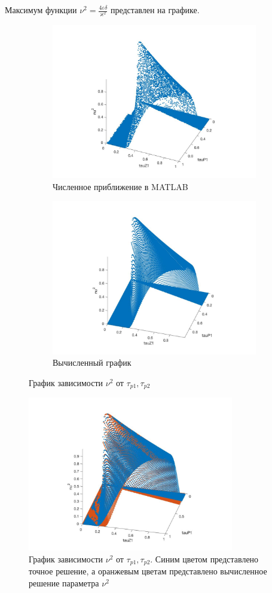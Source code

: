 \documentclass[a4paper,14pt]{extarticle} %
\begin{document}
  Максимум функции $\nu^2 = \frac{4\varepsilon\delta}{\varkappa^2}$ представлен на графике.
  \begin{figure}[H]
\begin{subfigure}{.5\textwidth}
  \includegraphics[width=9cm]{images/filter2_tau0_1e.jpg}
  \caption{Численное приближение в MATLAB}
  \label{filter2:sub1}
\end{subfigure}%
 \begin{subfigure}{.5\textwidth}
  \includegraphics[width=9cm]{images/filter2_tau0_1.jpg}
  \caption{Вычисленный график}
  \label{filter2:sub2}
\end{subfigure}%
\caption{График зависимости $\nu^2$ от $\tau_{p1}, \tau_{p2}$}
\label{filter2:filter2_fig}
\end{figure}

  \begin{figure}[H]
\includegraphics[width=9cm]{images/main.jpg}
\caption{График зависимости $\nu^2$ от $\tau_{p1}, \tau_{p2}$.  Синим цветом представлено точное решение, а оранжевым цветам представлено вычисленное решение параметра $\nu^2$}
\end{figure}
\end{document}
